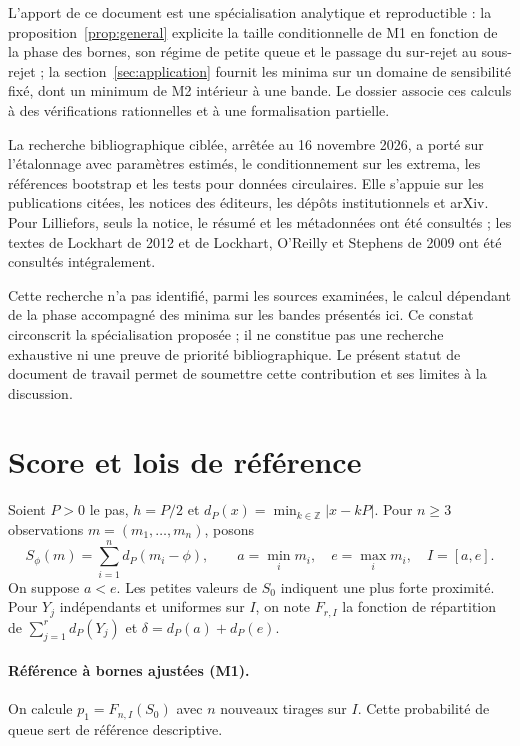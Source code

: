 \documentclass[11pt,a4paper]{article}
\begin{document}
L'apport de ce document est une spécialisation analytique et reproductible : la proposition~\ref{prop:general} explicite la taille conditionnelle de M1 en fonction de la phase des bornes, son régime de petite queue et le passage du sur-rejet au sous-rejet ; la section~\ref{sec:application} fournit les minima sur un domaine de sensibilité fixé, dont un minimum de M2 intérieur à une bande. Le dossier associe ces calculs à des vérifications rationnelles et à une formalisation partielle.

La recherche bibliographique ciblée, arrêtée au 16 novembre 2026, a porté sur l'étalonnage avec paramètres estimés, le conditionnement sur les extrema, les références bootstrap et les tests pour données circulaires. Elle s'appuie sur les publications citées, les notices des éditeurs, les dépôts institutionnels et arXiv. Pour Lilliefors, seuls la notice, le résumé et les métadonnées ont été consultés ; les textes de Lockhart de 2012 et de Lockhart, O'Reilly et Stephens de 2009 ont été consultés intégralement.

Cette recherche n'a pas identifié, parmi les sources examinées, le calcul dépendant de la phase accompagné des minima sur les bandes présentés ici. Ce constat circonscrit la spécialisation proposée ; il ne constitue pas une recherche exhaustive ni une preuve de priorité bibliographique. Le présent statut de document de travail permet de soumettre cette contribution et ses limites à la discussion.

\section{Score et lois de référence}

Soient $P>0$ le pas, $h=P/2$ et $d_P(x)=\min_{k\in\mathbb Z}|x-kP|$. Pour $n\geq3$ observations $m=(m_1,\ldots,m_n)$, posons
\[
S_\phi(m)=\sum_{i=1}^n d_P(m_i-\phi), \qquad
a=\min_i m_i,\quad e=\max_i m_i,\quad I=[a,e].
\]
On suppose $a<e$. Les petites valeurs de $S_0$ indiquent une plus forte proximité. Pour $Y_j$ indépendants et uniformes sur $I$, on note $F_{r,I}$ la fonction de répartition de $\sum_{j=1}^r d_P(Y_j)$ et $\delta=d_P(a)+d_P(e)$.

\paragraph{Référence à bornes ajustées (M1).}
On calcule $p_1=F_{n,I}(S_0)$ avec $n$ nouveaux tirages sur $I$. Cette probabilité de queue sert de référence descriptive.
\end{document}
